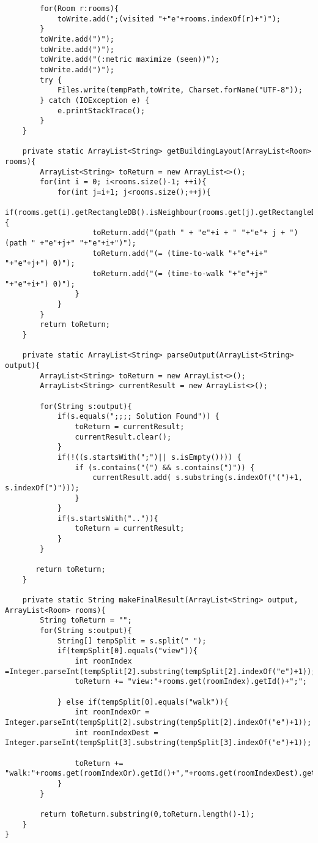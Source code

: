 \documentclass{article}
\begin{document}
\begin{lstlisting}
        for(Room r:rooms){
            toWrite.add(";(visited "+"e"+rooms.indexOf(r)+")");
        }
        toWrite.add(")");
        toWrite.add(")");
        toWrite.add("(:metric maximize (seen))");
        toWrite.add(")");
        try {
            Files.write(tempPath,toWrite, Charset.forName("UTF-8"));
        } catch (IOException e) {
            e.printStackTrace();
        }
    }

    private static ArrayList<String> getBuildingLayout(ArrayList<Room> rooms){
        ArrayList<String> toReturn = new ArrayList<>();
        for(int i = 0; i<rooms.size()-1; ++i){
            for(int j=i+1; j<rooms.size();++j){
                if(rooms.get(i).getRectangleDB().isNeighbour(rooms.get(j).getRectangleDB())){
                    toReturn.add("(path " + "e"+i + " "+"e"+ j + ") (path " +"e"+j+" "+"e"+i+")");
                    toReturn.add("(= (time-to-walk "+"e"+i+" "+"e"+j+") 0)");
                    toReturn.add("(= (time-to-walk "+"e"+j+" "+"e"+i+") 0)");
                }
            }
        }
        return toReturn;
    }

    private static ArrayList<String> parseOutput(ArrayList<String> output){
        ArrayList<String> toReturn = new ArrayList<>();
        ArrayList<String> currentResult = new ArrayList<>();

        for(String s:output){
            if(s.equals(";;;; Solution Found")) {
                toReturn = currentResult;
                currentResult.clear();
            }
            if(!((s.startsWith(";")|| s.isEmpty()))) {
                if (s.contains("(") && s.contains(")")) {
                    currentResult.add( s.substring(s.indexOf("(")+1, s.indexOf(")")));
                }
            }
            if(s.startsWith("..")){
                toReturn = currentResult;
            }
        }

       return toReturn;
    }

    private static String makeFinalResult(ArrayList<String> output, ArrayList<Room> rooms){
        String toReturn = "";
        for(String s:output){
            String[] tempSplit = s.split(" ");
            if(tempSplit[0].equals("view")){
                int roomIndex =Integer.parseInt(tempSplit[2].substring(tempSplit[2].indexOf("e")+1));
                toReturn += "view:"+rooms.get(roomIndex).getId()+";";

            } else if(tempSplit[0].equals("walk")){
                int roomIndexOr = Integer.parseInt(tempSplit[2].substring(tempSplit[2].indexOf("e")+1));
                int roomIndexDest = Integer.parseInt(tempSplit[3].substring(tempSplit[3].indexOf("e")+1));

                toReturn += "walk:"+rooms.get(roomIndexOr).getId()+","+rooms.get(roomIndexDest).getId()+";";
            }
        }

        return toReturn.substring(0,toReturn.length()-1);
    }
}
\end{lstlisting}
\newpage
\end{document}
